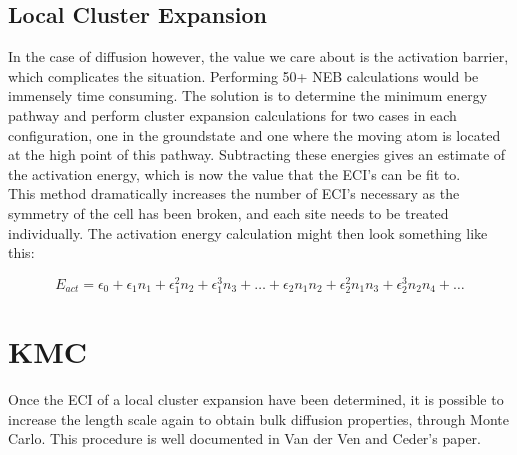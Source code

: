 \documentclass[12pt]{article}
\begin{document}
\subsection{Local Cluster Expansion}
In the case of diffusion however, the value we care about is the activation barrier, which complicates the situation.  Performing 50+ NEB calculations would be immensely time consuming.  The solution is to determine the minimum energy pathway and perform cluster expansion calculations for two cases in each configuration, one in the groundstate and one where the moving atom is located at the high point of this pathway.  Subtracting these energies gives an estimate of the activation energy, which is now the value that the ECI's can be fit to.  \\

This method dramatically increases the number of ECI's necessary as the symmetry of the cell has been broken, and each site needs to be treated individually.  The activation energy calculation might then look something like this:

\[
E_{act} = \epsilon_0 + \epsilon_1 n_1 + \epsilon_1^2 n_2 + \epsilon_1^3 n_3 + \dots + \epsilon_2 n_1n_2 +\epsilon_2^2 n_1n_3 + \epsilon_2^3 n_2n_4 + \dots
\]



\section{KMC}
Once the ECI of a local cluster expansion have been determined, it is possible to increase the length scale again to obtain bulk diffusion properties, through Monte Carlo.  This procedure is well documented in Van der Ven and Ceder's paper.  
\end{document}
